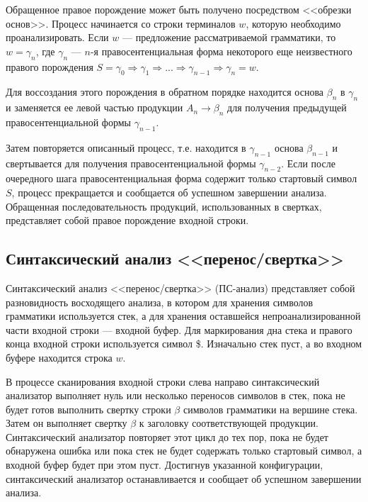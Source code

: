 \documentclass[bachelor, och, coursework, times]{SCWorks}
\begin{document}
Обращенное правое порождение может быть получено посредством <<обрезки основ>>. Процесс начинается со строки терминалов $w$, которую необходимо проанализировать. Если $w$ --- предложение рассматриваемой грамматики, то $w = \gamma_n$, где $\gamma_n$ --- $n$-я правосентенциальная форма некоторого еще неизвестного правого порождения $S = \gamma_0 \Rightarrow \gamma_1 \Rightarrow ... \Rightarrow \gamma_{n-1} \Rightarrow \gamma_n = w$.
 
Для воссоздания этого порождения в обратном порядке находится основа $\beta_n$ в $\gamma_n$ и заменяется ее левой частью продукции $A_n \to \beta_n$ для получения предыдущей правосентенциальной формы $\gamma_{n-1}$.

Затем повторяется описанный процесс, т.е. находится в $\gamma_{n-1}$ основа $\beta_{n-1}$ и свертывается для получения правосентенциальной формы $\gamma_{n-2}$. Если после очередного шага правосентенциальная форма содержит только стартовый символ $S$, процесс прекращается и сообщается об успешном завершении анализа.  
Обращенная последовательность продукций, использованных в свертках, представляет 
собой правое порождение входной строки.~\cite{Sereb}




\subsection{Синтаксический анализ <<перенос/свертка>> }

Синтаксический анализ <<перенос/свертка>> (ПС-анализ) представляет собой разновидность восходящего анализа, в котором для хранения символов грамматики используется стек, а для хранения оставшейся непроанализированной части входной строки --- входной буфер. Для маркирования дна стека и правого конца входной строки используется символ \$. Изначально стек пуст, а во входном буфере находится 
строка $w$.

В процессе сканирования входной строки слева направо синтаксический анализатор выполняет нуль или несколько переносов символов в стек, пока не будет готов выполнить свертку строки $\beta$ символов грамматики на вершине стека. Затем он выполняет свертку $\beta$ к заголовку соответствующей продукции. Синтаксический анализатор повторяет этот цикл до тех пор, пока не будет обнаружена ошибка или пока стек не будет содержать только стартовый символ, а входной буфер будет при этом пуст. Достигнув указанной конфигурации, синтаксический анализатор останавливается и сообщает об успешном завершении анализа. 
\end{document}
